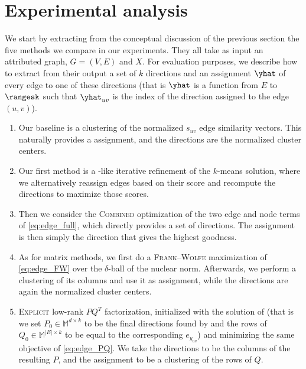 \section{Experimental analysis}
\label{sec:edge_exp}

We start by extracting from the conceptual discussion of the previous section the five methods we
compare in our experiments. They all take as input an attributed graph, \ie{} $G=(V, E)$ and $X$.
For evaluation purposes, we describe how to extract from their output a set of $k$ directions and an
assignment $\yhat$ of every edge to one of these directions (that is $\yhat$ is a function from $E$
to $\rangesk$ such that $\yhat_{uv}$ is the index of the direction assigned to the edge $(u,v)$).

\begin{enumerate}[1.]

  \item Our baseline is a \kmeans{} clustering of the normalized $s_{uv}$ edge similarity
    vectors. This naturally provides a \yhat{} assignment, and the directions are the normalized
    cluster centers.

  \item Our first method is a \lloyd{}-like iterative refinement of the $k$-means solution, where we
    alternatively reassign edges based on their score and recompute the directions to maximize those
    scores.

  \item Then we consider the \textsc{Combined} optimization of the two edge and node terms of
    \eqref{eq:edge_full}, which directly provides a set of directions. The assignment is then simply
    the direction that gives the highest goodness.

  \item As for matrix methods, we first do a \textsc{Frank--Wolfe} maximization of
    \eqref{eq:edge_FW} over the $\delta$-ball of the nuclear norm. Afterwards, we perform a
    \kmeans{} clustering of its columns and use it as assignment, while the directions are again the
    normalized cluster centers.

  \item \textsc{Explicit} low-rank $PQ^T$ factorization, initialized with the solution of
    \combined{} (that is we set $P_0 \in \mathbb{M}^{d\times k}$ to be the final directions found by
    \combined{} and the rows of $Q_0 \in \mathbb{M}^{|E|\times k}$ to be equal to the corresponding
    $e_{y_{uv}}$) and minimizing the same objective of \eqref{eq:edge_PQ}. We take the directions to
    be the columns of the resulting $P$, and the assignment to be a \kmeans{} clustering of the rows
    of $Q$.
\end{enumerate}

